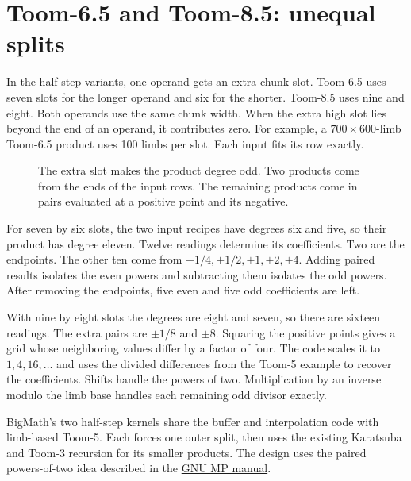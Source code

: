 \newpage
\section{Toom-6.5 and Toom-8.5: unequal splits}
\label{sec:toomhalf}

In the half-step variants, one operand gets an extra chunk slot. Toom-6.5
uses seven slots for the longer operand and six for the shorter.
Toom-8.5 uses nine and eight. Both operands use the same chunk width.
When the extra high slot lies beyond the end of an operand, it contributes
zero. For example, a $700\times600$-limb Toom-6.5 product uses 100 limbs
per slot. Each input fits its row exactly.

\begin{figure}[H]
\centering
{}
\caption{The extra slot makes the product degree odd. Two products come
from the ends of the input rows. The remaining products come in pairs
evaluated at a positive point and its negative.}
\end{figure}

For seven by six slots, the two input recipes have degrees six and five,
so their product has degree eleven. Twelve readings determine its
coefficients. Two are the endpoints. The other ten come from
$\pm1/4,\pm1/2,\pm1,\pm2,\pm4$. Adding paired results isolates the even
powers and subtracting them isolates the odd powers. After removing the
endpoints, five even and five odd coefficients are left.

With nine by eight slots the degrees are eight and seven, so there are
sixteen readings. The extra pairs are $\pm1/8$ and $\pm8$. Squaring the
positive points gives a grid whose neighboring values differ by a factor
of four. The code scales it to $1,4,16,\ldots$ and uses the divided
differences from the Toom-5 example to recover the coefficients. Shifts
handle the powers of two. Multiplication by an inverse modulo the limb
base handles each remaining odd divisor exactly.

BigMath's two half-step kernels share the buffer and interpolation code
with limb-based Toom-5. Each forces one outer split, then uses the existing
Karatsuba and Toom-3 recursion for its smaller products. The design uses
the paired powers-of-two idea described in the
\href{https://gmplib.org/manual/Higher-degree-Toom_0027n_0027half}{GNU MP manual}.
